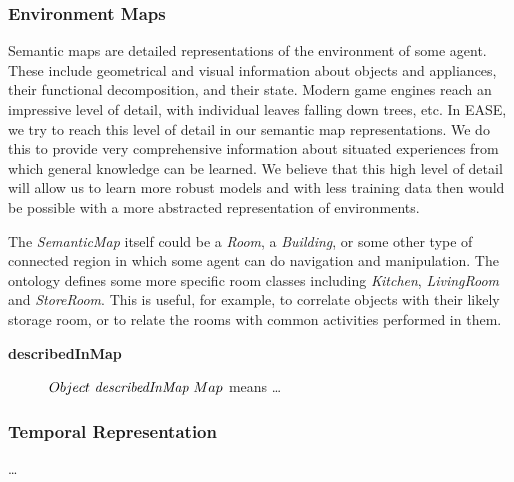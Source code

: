 \subsubsection{Environment Maps}
Semantic maps are detailed representations of the environment of some agent.
These include geometrical and visual information about objects and appliances,
their functional decomposition, and their state.
Modern game engines reach an impressive level of detail, with individual
leaves falling down trees, etc.
In EASE, we try to reach this level of detail in our semantic map representations.
We do this to provide very comprehensive information about situated experiences
from which general knowledge can be learned.
We believe that this high level of detail will allow us to learn more robust
models and with less training data then would be possible with
a more abstracted representation of environments.

The \emph{SemanticMap} itself could be a \emph{Room}, a \emph{Building}, or some other type of connected
region in which some agent can do navigation and manipulation.
The ontology defines some more specific room classes including
\emph{Kitchen}, \emph{LivingRoom} and \emph{StoreRoom}.
This is useful, for example, to correlate objects with their likely storage room,
or to relate the rooms with common activities performed in them.

\begin{description}
\item[\textbf{describedInMap}]
$Object\ \emph{describedInMap}\ Map$ means \dots
\end{description}



\subsubsection{Temporal Representation}
\dots